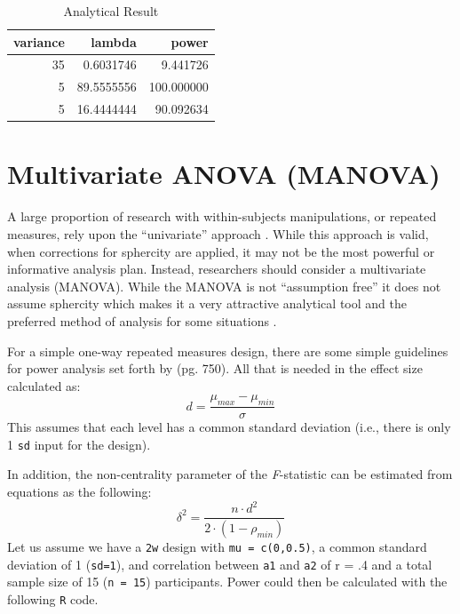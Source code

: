 \documentclass[
]{book}
\begin{document}
\begin{table}[!h]

\caption{\label{tab:unnamed-chunk-146}Analytical Result}
\centering
\begin{tabular}[t]{r|r|r}
\hline
variance & lambda & power\\
\hline
35 & 0.6031746 & 9.441726\\
\hline
5 & 89.5555556 & 100.000000\\
\hline
5 & 16.4444444 & 90.092634\\
\hline
\end{tabular}
\end{table}

\hypertarget{multivariate-anova-manova}{%
\section{Multivariate ANOVA (MANOVA)}\label{multivariate-anova-manova}}

A large proportion of research with within-subjects manipulations, or repeated measures, rely upon the ``univariate'' approach \citep{maxwell_designing_2004}. While this approach is valid, when corrections for sphercity are applied, it may not be the most powerful or informative analysis plan. Instead, researchers should consider a multivariate analysis (MANOVA). While the MANOVA is not ``assumption free'' it does not assume sphercity which makes it a very attractive analytical tool and the preferred method of analysis for some situations \citep{maxwell_designing_2004}.

For a simple one-way repeated measures design, there are some simple guidelines for power analysis set forth by \citet{maxwell_designing_2004} (pg. 750). All that is needed in the effect size calculated as:
\[ d = \frac{\mu_{max}-\mu_{min}}{\sigma} \]
This assumes that each level has a common standard deviation (i.e., there is only 1 \texttt{sd} input for the design).

In addition, the non-centrality parameter of the \emph{F}-statistic can be estimated from \citet{vonesh1986sample} equations as the following:
\[ \delta^2 = \frac{n \cdot d^2}{2\cdot(1-\rho_{min} )} \]
\newpage
Let us assume we have a \texttt{2w} design with \texttt{mu\ =\ c(0,0.5)}, a common standard deviation of 1 (\texttt{sd=1}), and correlation between \texttt{a1} and \texttt{a2} of r = .4 and a total sample size of 15 (\texttt{n\ =\ 15}) participants.
Power could then be calculated with the following \texttt{R} code.
\end{document}
